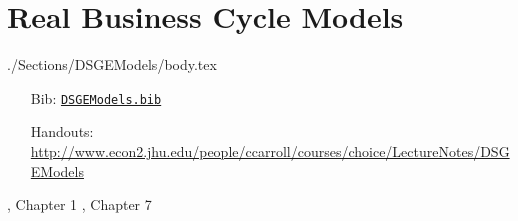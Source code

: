 \documentclass{econtex}
\begin{document}
\section{Real Business Cycle Models}
\begin{verbatimwrite}{./Sections/DSGEModels/body.tex}
\begin{itemize}
\item[Bib:] \texttt{\href{http://www.econ2.jhu.edu/people/ccarroll/courses/Choice/Syllabus/DSGEModels.bib}{DSGEModels.bib}}
\item[Handouts:]  \url{http://www.econ2.jhu.edu/people/ccarroll/courses/choice/LectureNotes/DSGEModels}
\end{itemize}

\providecommand{\blf}{\cite{blanchard&fischer:text}}
\providecommand{\ro}{\cite{romer:text}}
\bi
\reqd \blf, Chapter 1
\reqd \blf, Chapter 7
\reqd \cite{prescottTheoryAhead}
\reqd \cite{summers:skeptical}
\ei

\end{verbatimwrite}



\ifPost
{} 
\fi
\pagebreak

\renewcommand\refname{\noindent{\href{http://www.econ2.jhu.edu/people/ccarroll/courses/Choice/Syllabus.bib}{\large Readings {\small (click to download \texttt{.bib} file)}}}}


\end{document}
